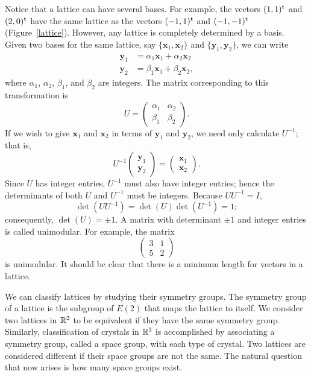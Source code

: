  
Notice that a lattice can have several bases. For example, the vectors
$(1,1)^{\rm t}$ and $(2,0)^{\rm t}$ have the  same lattice as the
vectors $(-1, 1)^{\rm t}$ and $(-1, -1)^{\rm t}$
(Figure~\ref{lattice}). However, any lattice is completely determined
by a basis. Given two bases for the same lattice, say $\{ {\mathbf x}_1,
{\mathbf x}_2 \}$ and $\{ {\mathbf y}_1, {\mathbf y}_2 \}$, we can write 
\begin{align*}
{\mathbf y}_1 & = \alpha_1  {\mathbf x}_1 + \alpha_2 {\mathbf x}_2 \\
{\mathbf y}_2 & = \beta_1  {\mathbf x}_1 + \beta_2 {\mathbf x}_2,
\end{align*}
where $\alpha_1$, $\alpha_2$, $\beta_1$, and $\beta_2$ are integers.
The matrix corresponding to this transformation is 
\[
U
=
\begin{pmatrix}
\alpha_1 & \alpha_2 \\
\beta_1 & \beta_2
\end{pmatrix}.
\]
If we wish to give ${\mathbf x}_1$ and ${\mathbf x}_2$ in terms of ${\mathbf
y}_1$ and ${\mathbf y}_2$, we need only calculate $U^{-1}$; that is, 
\[
U^{-1}
\begin{pmatrix}
{\mathbf y}_1 \\ {\mathbf y}_2
\end{pmatrix}
=
\begin{pmatrix}
{\mathbf x}_1 \\ {\mathbf x}_2
\end{pmatrix}.
\]
Since $U$ has integer entries, $U^{-1}$ must also have integer
entries; hence the determinants of both $U$ and $U^{-1}$ must be
integers. Because $U U^{-1} = I$,  
\[
\det(U U^{-1}) =\det(U) \det( U^{-1}) = 1;
\]
consequently, $\det(U) = \pm 1$. A matrix with determinant $\pm 1$ and
integer entries is called {\bfi unimodular}.
For example, the matrix 
\[
\begin{pmatrix}
3 & 1 \\
5 & 2
\end{pmatrix}
\]
is unimodular. It should be clear that there is a minimum length for
vectors in a lattice.  
 
 
We can classify lattices by studying their symmetry groups. The
symmetry group of a lattice is the subgroup of $E(2)$ that maps the
lattice to itself. We consider two lattices in ${\Bbb R}^2$ to be
equivalent if they have the same symmetry group.  Similarly,
classification of crystals in ${\Bbb R}^3$ is accomplished by
associating a symmetry group, called a {\bfi space group}, with each
type of crystal. Two lattices are considered
different if their space groups are not the same.  The natural
question that now arises is how many space groups exist. 
 
